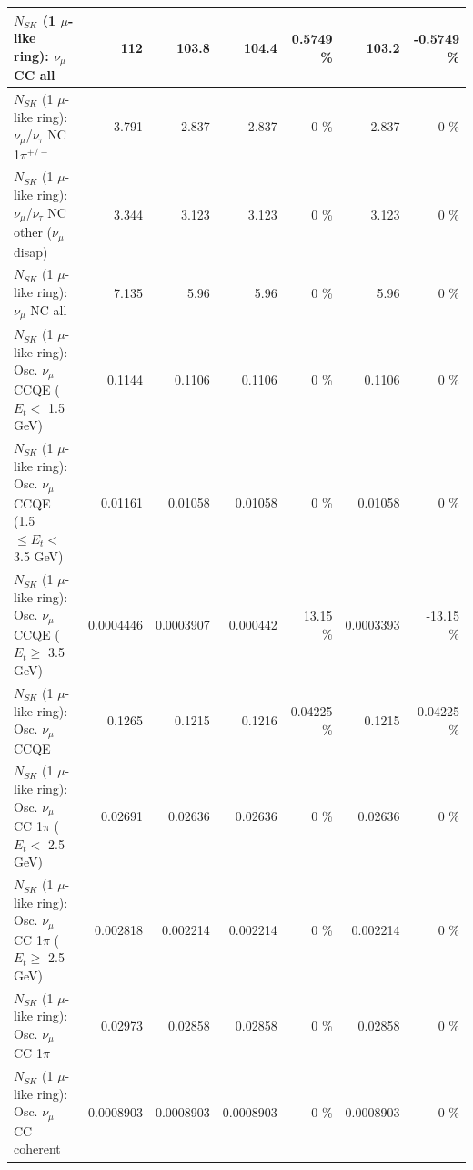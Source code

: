 \begin{table}
\begin{tabular}{| l | r | r | r  r | r  r |}
                                $N_{SK}$ (1 $\mu$-like ring): $\nu_{\mu}$ CC all &             112 &           103.8 &           104.4 &   0.5749 \%  &           103.2 &  -0.5749 \%  \\ 
\hline
              $N_{SK}$ (1 $\mu$-like ring): $\nu_\mu$/$\nu_\tau$ NC 1$\pi^{+/-}$ &           3.791 &           2.837 &           2.837 &        0 \%  &           2.837 &        0 \%  \\ 
   $N_{SK}$ (1 $\mu$-like ring): $\nu_\mu$/$\nu_\tau$ NC other ($\nu_\mu$ disap) &           3.344 &           3.123 &           3.123 &        0 \%  &           3.123 &        0 \%  \\ 
                                $N_{SK}$ (1 $\mu$-like ring): $\nu_{\mu}$ NC all &           7.135 &            5.96 &            5.96 &        0 \%  &            5.96 &        0 \%  \\ 
\hline
\hline
           $N_{SK}$ (1 $\mu$-like ring): Osc. $\nu_\mu$ CCQE ($E_{t} <$ 1.5 GeV) &          0.1144 &          0.1106 &          0.1106 &        0 \%  &          0.1106 &        0 \%  \\ 
  $N_{SK}$ (1 $\mu$-like ring): Osc. $\nu_\mu$ CCQE (1.5 $\leq E_{t} <$ 3.5 GeV) &         0.01161 &         0.01058 &         0.01058 &        0 \%  &         0.01058 &        0 \%  \\ 
        $N_{SK}$ (1 $\mu$-like ring): Osc. $\nu_\mu$ CCQE ($E_{t} \geq$ 3.5 GeV) &       0.0004446 &       0.0003907 &        0.000442 &    13.15 \%  &       0.0003393 &   -13.15 \%  \\ 
\hline
                               $N_{SK}$ (1 $\mu$-like ring): Osc. $\nu_\mu$ CCQE &          0.1265 &          0.1215 &          0.1216 &  0.04225 \%  &          0.1215 & -0.04225 \%  \\ 
\hline
      $N_{SK}$ (1 $\mu$-like ring): Osc. $\nu_\mu$ CC 1$\pi$ ($E_{t} <$ 2.5 GeV) &         0.02691 &         0.02636 &         0.02636 &        0 \%  &         0.02636 &        0 \%  \\ 
   $N_{SK}$ (1 $\mu$-like ring): Osc. $\nu_\mu$ CC 1$\pi$ ($E_{t} \geq$ 2.5 GeV) &        0.002818 &        0.002214 &        0.002214 &        0 \%  &        0.002214 &        0 \%  \\ 
\hline
                          $N_{SK}$ (1 $\mu$-like ring): Osc. $\nu_\mu$ CC 1$\pi$ &         0.02973 &         0.02858 &         0.02858 &        0 \%  &         0.02858 &        0 \%  \\ 
                        $N_{SK}$ (1 $\mu$-like ring): Osc. $\nu_\mu$ CC coherent &       0.0008903 &       0.0008903 &       0.0008903 &        0 \%  &       0.0008903 &        0 \%  \\ 

\end{tabular}
\end{table}
